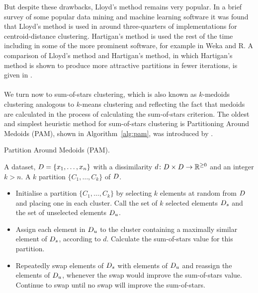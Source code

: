 But despite these drawbacks, Lloyd's method remains very popular.  In a brief
survey of some popular data mining and machine learning software it was found
that Lloyd's method is used in around three-quarters of implementations for
centroid-distance clustering.  Hartigan's method is used the rest of the time
including in some of the more prominent software, for example in Weka and R.
A comparison of Lloyd's method and Hartigan's method, in which Hartigan's
method is shown to produce more attractive partitions in fewer iterations, is
given in \citep{telgarsky2010hartigan}.
\\\\
\noindent We turn now to sum-of-stars clustering, which is also known as
$k$-medoids clustering analogous to $k$-means clustering and reflecting the
fact that medoids are calculated in the process of calculating the
sum-of-stars criterion.  The oldest and simplest heuristic method for
sum-of-stars clustering is Partitioning Around Medoids (PAM), shown in
Algorithm~\ref{alg:pam}, was introduced by \citet{kaufman2005finding}.
\begin{algorithm}[h]
  \caption{Partition Around Medoids (PAM).}
  \label{alg:pam}
  \begin{algorithmic}
    \Require A dataset, $D = \{x_1,\dotsc,x_n\}$ with a dissimilarity $d
             \colon D \times D \to \mathbb{R}^{\geq 0}$ and an integer
             $k > n$.
    \Ensure  A $k$ partition $\{C_1,\dotsc,C_k\}$ of $D$.
    \begin{itemize}
    \item Initialise a partition $\{C_1,\dotsc,C_k\}$ by selecting $k$
      elements at random from $D$ and placing one in each cluster.  Call
      the set of $k$ selected elements $D_s$ and the set of unselected
      elements $D_u$.
    \item Assign each element in $D_u$ to the cluster containing a
      maximally similar element of $D_s$, according to $d$.  Calculate the
      sum-of-stars value for this partition.
    \item Repeatedly swap elements of $D_s$ with elements of $D_u$ and
      reassign the elements of $D_u$, whenever the swap would improve the
      sum-of-stars value.  Continue to swap until no swap will improve the
      sum-of-stars.
    \end{itemize}
  \end{algorithmic}

\end{algorithm}


